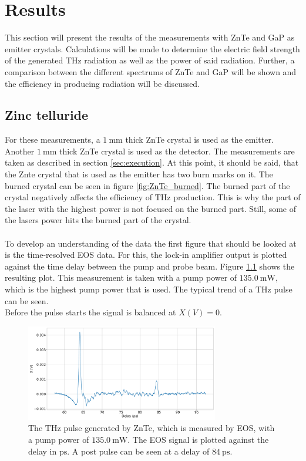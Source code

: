 \chapter{Results}
This section will present the results of the measurements with ZnTe and GaP as emitter crystals.
Calculations will be made to determine the electric field strength of the generated $\si{\tera\hertz}$ radiation as well as the power of said radiation.
Further, a comparison between the different spectrums of ZnTe and GaP will be shown and the efficiency in producing radiation will be discussed.

\section{Zinc telluride}
For these measurements, a $\SI{1}{\milli\meter}$ thick ZnTe crystal is used as the emitter.
Another $\SI{1}{\milli\meter}$ thick ZnTe crystal is used as the detector.
The measurements are taken as described in section \ref{sec:execution}.
At this point, it should be said, that the Znte crystal that is used as the emitter has two burn marks on it.
The burned crystal can be seen in figure \ref{fig:ZnTe_burned}.
The burned part of the crystal negatively affects the efficiency of $\si{\tera\hertz}$ production.
This is why the part of the laser with the highest power is not focused on the burned part.
Still, some of the lasers power hits the burned part of the crystal.
\\\\
To develop an understanding of the data the first figure that should be looked at is the time-resolved EOS data.
For this, the lock-in amplifier output is plotted against the time delay between the pump and probe beam.
Figure \ref{ZnTe:2_11_30_20_signal} shows the resulting plot.
This measurement is taken with a pump power of $\SI{135.0}{\milli\W}$, which is the highest pump power that is used.
The typical trend of a $\si{\tera\hertz}$ pulse can be seen.
\\
Before the pulse starts the signal is balanced at $X(V)=0$.
\begin{figure}
    \centering
    \includegraphics[width=0.75\textwidth]{Plots/2_11_30_20normalX.pdf}
    \caption{The $\si{\tera\hertz}$ pulse generated by ZnTe, which is measured by EOS, with a pump power of $\SI{135.0}{\milli\W}$.
    The EOS signal is plotted against the delay in $\si{\pico\second}$.
    A post pulse can be seen at a delay of $\SI{84}{\pico\second}$.}
    \label{ZnTe:2_11_30_20_signal}
\end{figure}
